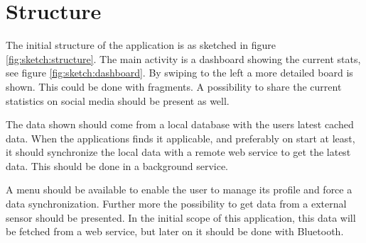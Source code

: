 \chapter{Structure}
The initial structure of the application is as sketched in figure \ref{fig:sketch:structure}. The main activity is a dashboard showing the current stats, see figure \ref{fig:sketch:dashboard}. By swiping to the left a more detailed board is shown. This could be done with fragments. A possibility to share the current statistics on social media should be present as well.


The data shown should come from a local database with the users latest cached data. When the applications finds it applicable, and preferably on start at least, it should synchronize the local data with a remote web service to get the latest data. This should be done in a background service.

A menu should be available to enable the user to manage its profile and force a data synchronization. Further more the possibility to get data from a external sensor should be presented. In the initial scope of this application, this data will be fetched from a web service, but later on it should be done with Bluetooth.

